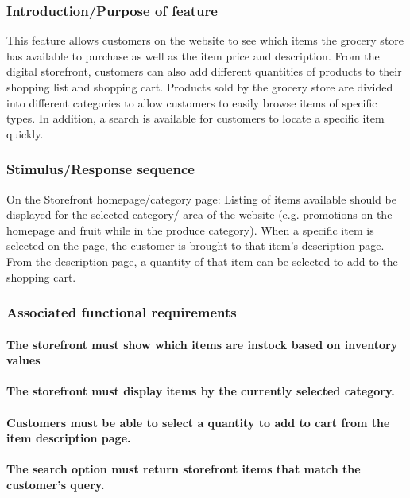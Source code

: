\documentclass{scrreprt}
\begin{document}
\subsubsection{Introduction/Purpose of feature}
This feature allows customers on the website to see which items the grocery store has available to purchase as well as the item price and description.  From the digital storefront, customers can also add different quantities of products to their shopping list and shopping cart.  Products sold by the grocery store are divided into different categories to allow customers to easily browse items of specific types.  In addition, a search is available for customers to locate a specific item quickly.
\subsubsection{Stimulus/Response sequence}
On the Storefront homepage/category page: Listing of items available should be displayed for the selected category/ area of the website (e.g. promotions on the homepage and fruit while in the produce category).  When a specific item is selected on the page, the customer is brought to that item’s description page.  From the description page, a quantity of that item can be selected to add to the shopping cart.  
\subsubsection{Associated functional requirements}
\paragraph[]{\normalfont The storefront must show which items are instock based on inventory values}
\paragraph[]{\normalfont The storefront must display items by the currently selected category.}
\paragraph[]{\normalfont Customers must be able to select a quantity to add to cart from the item description page.}
\paragraph[]{\normalfont The search option must return storefront items that match the customer’s query.}
\end{document}
